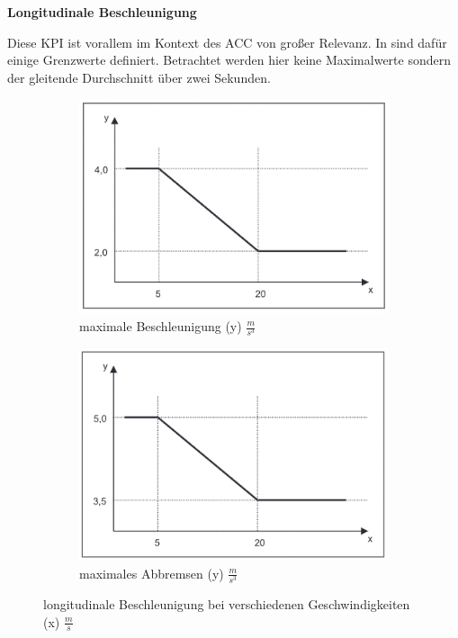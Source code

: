 \bigskip\noindent\textbf{Longitudinale Beschleunigung}

\noindent Diese KPI ist vorallem im Kontext des ACC von großer Relevanz. In \cite{ISO15622} sind dafür einige Grenzwerte definiert. Betrachtet werden hier keine Maximalwerte sondern der gleitende Durchschnitt über zwei Sekunden.
\begin{figure}
    \centering
    \begin{subfigure}[b]{.4\textwidth}
        \centering
        \includegraphics[width=\textwidth]{figures/3_Implementierung/max_acceleration.png}
        \caption{maximale Beschleunigung (y) $\frac{m}{s^{3}}$}
        \label{fig:max_acceleration}
    \end{subfigure}
    \hfill
    \begin{subfigure}[b]{.4\textwidth}
        \centering
        \includegraphics[width=\textwidth]{figures/3_Implementierung/max_deceleration.png}
        \caption{maximales Abbremsen (y) $\frac{m}{s^{3}}$}
        \label{fig:max_deceleration}
    \end{subfigure}
    \caption{longitudinale Beschleunigung bei verschiedenen Geschwindigkeiten (x) $\frac{m}{s}$ \cite{ISO15622}}
    \label{fig:iso_acceleration}
\end{figure}

